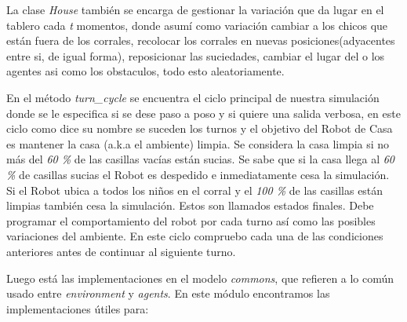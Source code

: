 \documentclass[a4paper,10pt,twocolumn]{article}
\begin{document}
 La clase \textit{House} tambi\'en se encarga de gestionar la variaci\'on que da lugar en el tablero cada \textit{t} momentos, donde asum\'i como variaci\'on cambiar a los chicos que est\'an fuera de los corrales, recolocar los corrales en nuevas posiciones(adyacentes entre si, de igual forma), reposicionar las suciedades, cambiar el lugar del o los agentes  asi como los obstaculos, todo esto aleatoriamente.
 
 En el m\'etodo \textit{turn\_cycle} se encuentra el ciclo principal de nuestra simulaci\'on donde se le especifica si se dese paso a poso y si quiere una salida verbosa, en este ciclo como dice su nombre se suceden los turnos y el objetivo del Robot de Casa es mantener la casa (a.k.a el ambiente) limpia. Se considera la casa limpia si no m\'as del \textit{60 \%} de las casillas vac\'ias est\'an sucias. Se sabe que si la casa llega al \textit{60 \%} de casillas sucias el Robot es despedido e inmediatamente cesa la simulaci\'on. Si el Robot ubica a todos los ni\~nos en el corral y el \textit{100 \%} de las casillas est\'an limpias tambi\'en cesa la simulaci\'on. Estos son llamados estados finales. Debe programar el comportamiento del robot por cada turno as\'i como las posibles variaciones del ambiente. En este ciclo compruebo cada una de las condiciones anteriores antes de continuar al siguiente turno.
 
 Luego est\'a las implementaciones en el modelo \textit{commons}, que refieren a lo com\'un usado entre \textit{environment} y \textit{agents}. En este m\'odulo encontramos las implementaciones \'utiles para:
 
\end{document}
